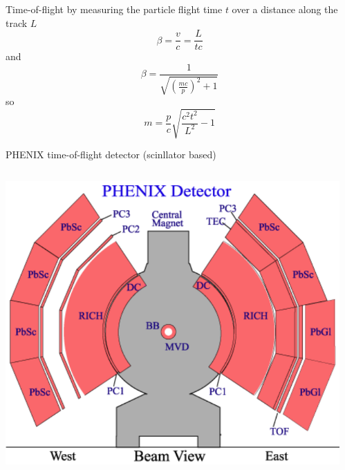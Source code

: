 \documentclass{beamer}
\begin{document}
\begin{frame}{Time-of-flight}
by measuring the particle flight time $t$ over a distance along the track $L$
  \begin{equation}
  \beta=\frac{v}{c}=\frac{L}{tc}
  \end{equation}
  and
  \begin{equation}
  \beta=\frac{1}{\sqrt{\left( \frac{mc}{p} \right)^2+1}}
  \end{equation}
  so
  \begin{equation}
  m=\frac{p}{c}\sqrt{\frac{c^2t^2}{L^2}-1}
  \end{equation}
\end{frame}


\begin{frame}{PHENIX time-of-flight detector (scinllator based)}
\begin{columns}
  \begin{column}{.5\textwidth}
    \includegraphics[width=\textwidth]{plots/Phenix_gv.pdf}
  \end{column}
  \begin{column}{.5\textwidth}

\end{column}
\end{columns}
\end{frame}
\end{document}
